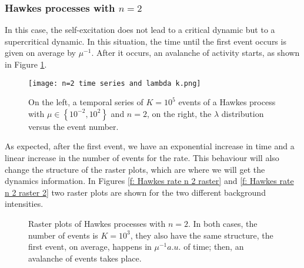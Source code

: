 \subsubsection{Hawkes processes with $n=2$} \label{subsubsec:Hawkes_processes_n_2}

In this case, the self-excitation does not lead to a critical dynamic but to a supercritical dynamic. In this situation, the time until the first event occurs is given on average by $\mu^{-1}$.
After it occurs, an avalanche of activity starts, as shown in Figure \ref{f: Hawkes rate n 2}.

\begin{figure}[H]
    \centering
    \texttt{[image: n=2 time series and lambda k.png]}
    \caption{On the left, a temporal series of $K=10^5$ events of a Hawkes process with $\mu\in \left\{ 10^{-2},10^{2}\right\}$ and $n=2$, on the right, the $\lambda$ distribution versus 
    the event number.}
    \label{f: Hawkes rate n 2}
\end{figure}

As expected, after the first event, we have an exponential increase in time and a linear increase in the number of events for the rate. This behaviour will also change the structure of the 
raster plots, which are where we will get the dynamics information. In Figures \ref{f: Hawkes rate n 2 raster} and \ref{f: Hawkes rate n 2 raster 2} two raster plots are shown for the
two different background intensities.

\begin{figure}[H]
    \subfigure[Background rate $\mu=10^{-4}$.]{
        \texttt{[image: raster n=2 mu=10-4.png]}
        \label{f: Hawkes rate n 2 raster}
    }
    \subfigure[Background rate $\mu=10^{2}$.]{
        \texttt{[image: raster n=2 mu=10+2.png]}
     \label{f: Hawkes rate n 2 raster 2}    
    }
    \caption{Raster plots of Hawkes processes with $n=2$. In both cases, the number of events is $K=10^3$, they also have the same structure, the first event, on average,
    happens in $\mu^{-1}a.u.$ of time; then, an avalanche of events takes place.}
    \label{f: Hawkes rate n 2 rasters}
\end{figure}

